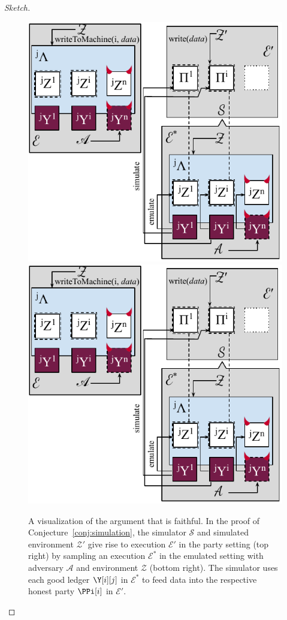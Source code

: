 \begin{proof}[Sketch]
  \begin{figure}
    \centering
    \iftwocolumn
    \includegraphics[width=0.9 \columnwidth,keepaspectratio]{figures/rollerblade-emulation.pdf}
    \else
    \includegraphics[width=0.7 \columnwidth,keepaspectratio]{figures/rollerblade-emulation.pdf}
    \fi
    \caption{A visualization of the argument that \rollerblade is faithful.
    In the proof of Conjecture~\ref{conj:simulation},
    the simulator $\mathcal{S}$ and simulated environment $\mathcal{Z}'$
    give rise to execution $\mathcal{E}'$ in the
    party setting (top right) by sampling an execution $\mathcal{E}^*$ in the emulated
    setting with adversary $\mathcal{A}$ and environment $\mathcal{Z}$
    (bottom right). The simulator uses each good ledger $\Y[i][j]$ in
    $\mathcal{E}^*$ to feed data into the respective honest party $\PPi[i]$
    in $\mathcal{E}'$. }
    \label{fig.conj.simulation}
  \end{figure}


\end{proof}
